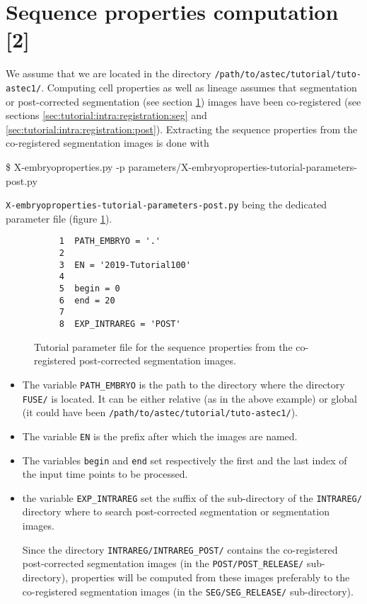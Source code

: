 \section{Sequence properties computation [2]}
\label{sec:tutorial:properties:post}

We assume that we are located in the directory
\texttt{/path/to/astec/tutorial/tuto-astec1/}.
Computing cell properties as well as lineage assumes that
 segmentation or post-corrected segmentation (see section
\ref{sec:tutorial:properties:post}) images have been
co-registered (see sections \ref{sec:tutorial:intra:registration:seg}
and \ref{sec:tutorial:intra:registration:post}). 
Extracting the sequence properties from the co-registered segmentation
images is
done with
\begin{code}{0.8}
  \$ X-embryoproperties.py -p parameters/X-embryoproperties-tutorial-parameters-post.py
\end{code}
\texttt{X-embryoproperties-tutorial-parameters-post.py} being the
dedicated parameter file  (figure \ref{fig:tutorial:parameter:properties:post}).

\begin{figure}
\begin{framed}
\begin{verbatim}
     1	PATH_EMBRYO = '.'
     2	
     3	EN = '2019-Tutorial100'
     4	
     5	begin = 0
     6	end = 20
     7	
     8	EXP_INTRAREG = 'POST'
\end{verbatim}
\end{framed}
\caption{\label{fig:tutorial:parameter:properties:post} Tutorial
  parameter file for the sequence properties from the co-registered
  post-corrected segmentation images.}
\end{figure}

\begin{itemize}
  \itemsep -0.5ex
  \item The variable \texttt{PATH\_EMBRYO} is the path to the directory where
    the directory \texttt{FUSE/} is located. It can be either relative (as in the
    above example) or
    global (it could have been \texttt{/path/to/astec/tutorial/tuto-astec1/}).
  \item The variable \texttt{EN} is the prefix after which the  images
    are named. 
  \item The variables \texttt{begin} and \texttt{end} set respectively the
    first and the last index of the input time points to be processed.
  \item  the variable \texttt{EXP\_INTRAREG} set the suffix of the
    sub-directory of the \texttt{INTRAREG/} directory where to search
    post-corrected segmentation or segmentation images.

    Since the directory \texttt{INTRAREG/INTRAREG\_POST/} 
    contains the co-registered post-corrected segmentation images (in the
    \texttt{POST/POST\_RELEASE/} sub-directory), properties will be computed from
    these images preferably to the co-registered segmentation images (in the
    \texttt{SEG/SEG\_RELEASE/} sub-directory).
\end{itemize}

